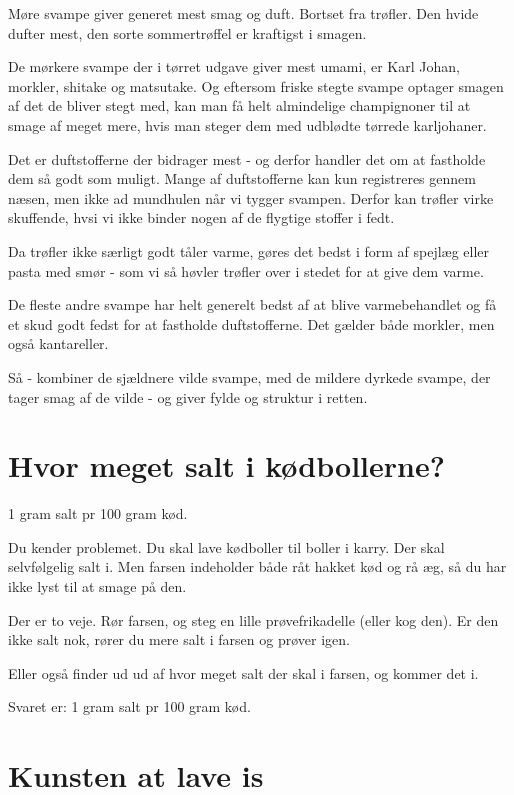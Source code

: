 \documentclass[
  letterpaper,
  DIV=11,
  numbers=noendperiod]{scrreprt}
\begin{document}
Møre svampe giver generet mest smag og duft. Bortset fra trøfler. Den
hvide dufter mest, den sorte sommertrøffel er kraftigst i smagen.

De mørkere svampe der i tørret udgave giver mest umami, er Karl Johan,
morkler, shitake og matsutake. Og eftersom friske stegte svampe optager
smagen af det de bliver stegt med, kan man få helt almindelige
champignoner til at smage af meget mere, hvis man steger dem med
udblødte tørrede karljohaner.

Det er duftstofferne der bidrager mest - og derfor handler det om at
fastholde dem så godt som muligt. Mange af duftstofferne kan kun
registreres gennem næsen, men ikke ad mundhulen når vi tygger svampen.
Derfor kan trøfler virke skuffende, hvsi vi ikke binder nogen af de
flygtige stoffer i fedt.

Da trøfler ikke særligt godt tåler varme, gøres det bedst i form af
spejlæg eller pasta med smør - som vi så høvler trøfler over i stedet
for at give dem varme.

De fleste andre svampe har helt generelt bedst af at blive
varmebehandlet og få et skud godt fedst for at fastholde duftstofferne.
Det gælder både morkler, men også kantareller.

Så - kombiner de sjældnere vilde svampe, med de mildere dyrkede svampe,
der tager smag af de vilde - og giver fylde og struktur i retten.

\hypertarget{hvor-meget-salt-i-kuxf8dbollerne}{%
\section{Hvor meget salt i
kødbollerne?}\label{hvor-meget-salt-i-kuxf8dbollerne}}

1 gram salt pr 100 gram kød.

Du kender problemet. Du skal lave kødboller til boller i karry. Der skal
selvfølgelig salt i. Men farsen indeholder både råt hakket kød og rå æg,
så du har ikke lyst til at smage på den.

Der er to veje. Rør farsen, og steg en lille prøvefrikadelle (eller kog
den). Er den ikke salt nok, rører du mere salt i farsen og prøver igen.

Eller også finder ud ud af hvor meget salt der skal i farsen, og kommer
det i.

Svaret er: 1 gram salt pr 100 gram kød.

\hypertarget{kunsten-at-lave-is}{%
\section{Kunsten at lave is}\label{kunsten-at-lave-is}}
\end{document}
